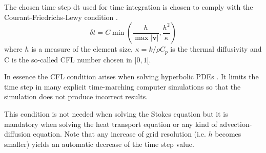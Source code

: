 The chosen time step dt used for time integration is chosen to
comply with the Courant-Friedrichs-Lewy condition \cite{cfd_anderson}.
\begin{equation}
\delta t = C \min \left( \frac{h}{\max |{\bm v}|} , \frac{h^2}{\kappa}  \right)
\end{equation}
where $h$ is a measure of the element size, $\kappa = k/ \rho C_p$ 
is the thermal diffusivity and C is the so-called CFL number chosen in $[0,1[$.

In essence the CFL condition arises when solving hyperbolic PDEs .
It limits the time step in many explicit time-marching computer simulations
so that the simulation does not produce incorrect results. 

This condition is not needed when solving the Stokes equation but it is mandatory 
when solving the heat transport equation or any kind of advection-diffusion equation. 
Note that any increase of grid resolution (i.e. $h$ becomes smaller) yields an automatic 
decrease of the time step value.





